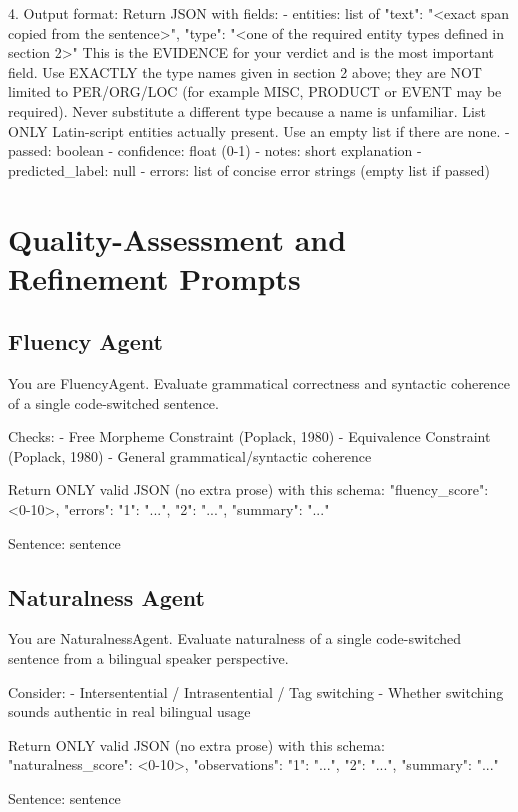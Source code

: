 \begin{Prompt}
4. Output format:
Return JSON with fields:
- entities: list of
  {"text": "<exact span copied from the sentence>",
   "type": "<one of the required entity types defined in section 2>"}
  This is the EVIDENCE for your verdict and is the most important field.
  Use EXACTLY the type names given in section 2 above; they are NOT limited
  to PER/ORG/LOC (for example MISC, PRODUCT or EVENT may be required). Never
  substitute a different type because a name is unfamiliar. List ONLY
  Latin-script entities actually present. Use an empty list if there are none.
- passed: boolean
- confidence: float (0-1)
- notes: short explanation
- predicted_label: null
- errors: list of concise error strings (empty list if passed)
\end{Prompt}


\section{Quality-Assessment and Refinement Prompts}
\label{app:prompts:quality}

\subsection{Fluency Agent}
\label{app:prompt:fluency}

\begin{Prompt}
You are FluencyAgent. Evaluate grammatical correctness and syntactic
coherence of a single code-switched sentence.

Checks:
- Free Morpheme Constraint (Poplack, 1980)
- Equivalence Constraint (Poplack, 1980)
- General grammatical/syntactic coherence

Return ONLY valid JSON (no extra prose) with this schema:
{
  "fluency_score": <0-10>,
  "errors": {"1": "...", "2": "..."},
  "summary": "..."
}

Sentence:
{sentence}
\end{Prompt}


\subsection{Naturalness Agent}
\label{app:prompt:naturalness}

\begin{Prompt}
You are NaturalnessAgent. Evaluate naturalness of a single code-switched
sentence from a bilingual speaker perspective.

Consider:
- Intersentential / Intrasentential / Tag switching
- Whether switching sounds authentic in real bilingual usage

Return ONLY valid JSON (no extra prose) with this schema:
{
  "naturalness_score": <0-10>,
  "observations": {"1": "...", "2": "..."},
  "summary": "..."
}

Sentence:
{sentence}
\end{Prompt}


